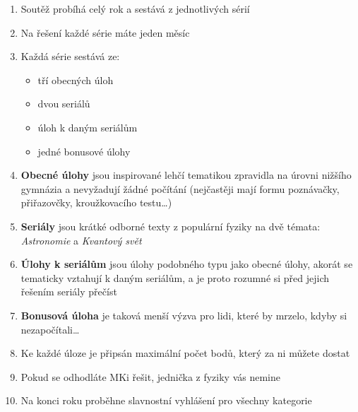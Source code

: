 \documentclass{article}
\begin{document}
\begin{enumerate}
    \item Soutěž probíhá celý rok a sestává z jednotlivých sérií
    \item Na řešení každé série máte jeden měsíc
    \item Každá série sestává ze:
    \begin{itemize}
        \item tří obecných úloh
        \item dvou seriálů
        \item úloh k daným seriálům
        \item jedné bonusové úlohy
    \end{itemize}
    \item \textbf{Obecné úlohy} jsou inspirované lehčí tematikou zpravidla na úrovni nižšího gymnázia a nevyžadují žádné počítání (nejčastěji mají formu poznávačky, přiřazovčky, kroužkovacího testu\dots)
    \item \textbf{Seriály} jsou krátké odborné texty z populární fyziky na dvě témata: \textit{Astronomie} a \textit{Kvantový svět}
    \item \textbf{Úlohy k seriálům} jsou úlohy podobného typu jako obecné úlohy, akorát se tematicky vztahují k daným seriálům, a je proto rozumné si před jejich řešením seriály přečíst
    \item \textbf{Bonusová úloha} je taková menší výzva pro lidi, které by mrzelo, kdyby si nezapočítali\dots
    \item Ke každé úloze je připsán maximální počet bodů, který za ni můžete dostat
    \item Pokud se odhodláte MKi řešit, jednička z fyziky vás nemine
    \item Na konci roku proběhne slavnostní vyhlášení pro všechny kategorie
    \end{enumerate}
\end{document}

